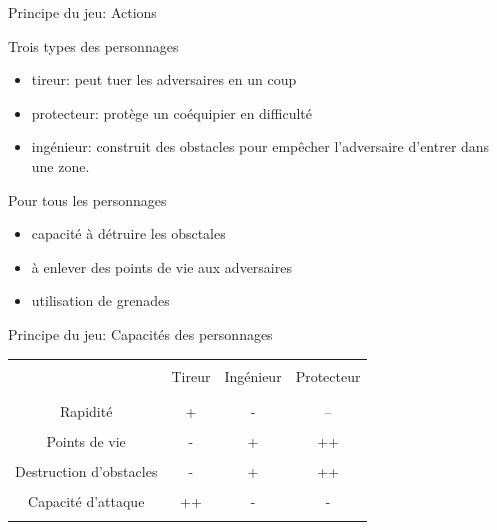 \documentclass[10pt]{beamer}
\begin{document}
\begin{frame}{Principe du jeu: Actions}

\begin{block}{Trois types des personnages}
\begin{itemize}
\item tireur: peut tuer les adversaires en un coup 
\item protecteur: prot\`ege un co\'equipier en difficult\'e 
\item ing\'enieur: construit des obstacles pour emp\^echer l'adversaire d'entrer dans une zone.
\end{itemize}
\end{block}

\bigskip

\begin{block}{Pour tous les personnages}
\begin{itemize}
\item capacit\'e \`a d\'etruire les obsctales
\item \`a enlever des points de vie aux adversaires
\item utilisation de grenades
\end{itemize}
\end{block}

\end{frame}

\begin{frame}{Principe du jeu: Capacit\'es des personnages}
\begin{tabular}{|c||c|c|c|}
\hline
&&&\\
					& Tireur & Ing\'enieur & Protecteur \\
&&&\\
\hline
&&&\\
Rapidit\'e 				& +        & -                 & --               \\
&&&\\
Points de vie			& -         & +                &++               \\
&&&\\
Destruction d'obstacles	& -         & +                & ++               \\
&&&\\
Capacit\'e d'attaque		& ++      & -                 & -                  \\
&&&\\
\hline
\end{tabular}

\end{frame}
\end{document}
